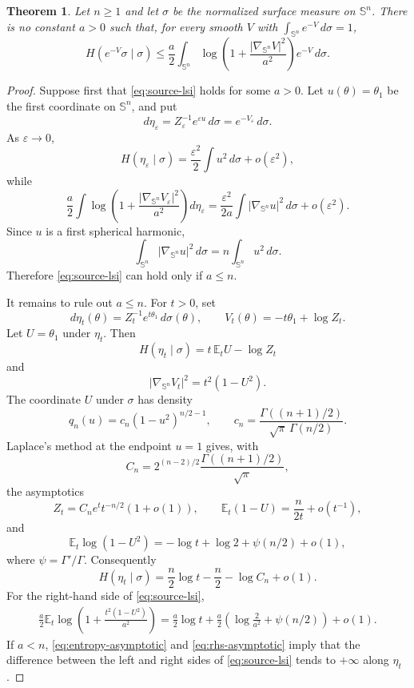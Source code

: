 \documentclass[11pt]{amsart}
\newtheorem{theorem}{Theorem}
\theoremstyle{remark}
\newcommand{\Sph}{\mathbb S}
\newcommand{\E}{\mathbb E}
\newcommand{\grad}{\nabla_{\Sph^n}}
\begin{document}
\begin{theorem}
\label{thm:no-constant}
Let $n\geq1$ and let $\sigma$ be the normalized surface measure on $\Sph^n$.
There is no constant $a>0$ such that, for every smooth $V$ with
$\int_{\Sph^n}e^{-V}\,d\sigma=1$,
\begin{equation}
\label{eq:source-lsi}
 H(e^{-V}\sigma\mid \sigma)
 \leq
 \frac a2 \int_{\Sph^n}
        \log\left(1+\frac{|\grad V|^2}{a^2}\right)e^{-V}\,d\sigma .
\end{equation}
\end{theorem}

\begin{proof}
Suppose first that \eqref{eq:source-lsi} holds for some $a>0$.  Let
$u(\theta)=\theta_1$ be the first coordinate on $\Sph^n$, and put
\[
        d\eta_\varepsilon
        =Z_\varepsilon^{-1}e^{\varepsilon u}\,d\sigma
        =e^{-V_\varepsilon}\,d\sigma .
\]
As $\varepsilon\to0$,
\[
 H(\eta_\varepsilon\mid\sigma)
 =\frac{\varepsilon^2}{2}\int u^2\,d\sigma+o(\varepsilon^2),
\]
while
\[
 \frac a2\int
 \log\left(1+\frac{|\grad V_\varepsilon|^2}{a^2}\right)d\eta_\varepsilon
 =
 \frac{\varepsilon^2}{2a}\int|\grad u|^2\,d\sigma+o(\varepsilon^2).
\]
Since $u$ is a first spherical harmonic,
\[
        \int_{\Sph^n}|\grad u|^2\,d\sigma
        =n\int_{\Sph^n}u^2\,d\sigma .
\]
Therefore \eqref{eq:source-lsi} can hold only if $a\leq n$.

It remains to rule out $a\leq n$.  For $t>0$, set
\[
        d\eta_t(\theta)=Z_t^{-1}e^{t\theta_1}\,d\sigma(\theta),
        \qquad
        V_t(\theta)=-t\theta_1+\log Z_t .
\]
Let $U=\theta_1$ under $\eta_t$.  Then
\[
        H(\eta_t\mid\sigma)=t\,\E_t U-\log Z_t
\]
and
\[
        |\grad V_t|^2=t^2(1-U^2).
\]
The coordinate $U$ under $\sigma$ has density
\[
        q_n(u)=c_n(1-u^2)^{n/2-1},\qquad
        c_n=\frac{\Gamma((n+1)/2)}{\sqrt{\pi}\,\Gamma(n/2)} .
\]
Laplace's method at the endpoint $u=1$ gives, with
\[
        C_n=2^{(n-2)/2}\frac{\Gamma((n+1)/2)}{\sqrt{\pi}},
\]
the asymptotics
\[
        Z_t=C_n e^t t^{-n/2}(1+o(1)),
        \qquad
        \E_t(1-U)=\frac{n}{2t}+o(t^{-1}),
\]
and
\[
        \E_t\log(1-U^2)
        =
        -\log t+\log2+\psi(n/2)+o(1),
\]
where $\psi=\Gamma'/\Gamma$.  Consequently
\begin{equation}
\label{eq:entropy-asymptotic}
        H(\eta_t\mid\sigma)
        =
        \frac n2\log t-\frac n2-\log C_n+o(1).
\end{equation}
For the right-hand side of \eqref{eq:source-lsi},
\begin{align}
\label{eq:rhs-asymptotic}
 \frac a2\E_t\log\left(1+\frac{t^2(1-U^2)}{a^2}\right)
 =
 \frac a2\log t
 +\frac a2\left(\log\frac{2}{a^2}+\psi(n/2)\right)+o(1).
\end{align}
If $a<n$, \eqref{eq:entropy-asymptotic} and \eqref{eq:rhs-asymptotic} imply
that the difference between the left and right sides of \eqref{eq:source-lsi}
tends to $+\infty$ along $\eta_t$.


\end{proof}
\end{document}
